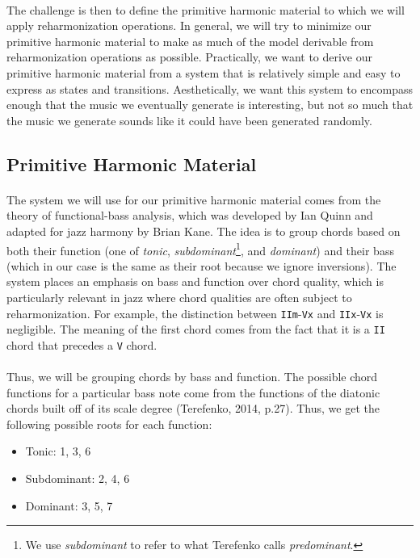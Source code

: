 \documentclass[]{article}
\begin{document}
\paragraph{} The challenge is then to define the primitive harmonic material to which we will apply reharmonization operations.  In general, we will try to minimize our primitive harmonic material to make as much of the model derivable from reharmonization operations as possible.  Practically, we want to derive our primitive harmonic material from a system that is relatively simple and easy to express as states and transitions.  Aesthetically, we want this system to encompass enough that the music we eventually generate is interesting, but not so much that the music we generate sounds like it could have been generated randomly.

\subsection{Primitive Harmonic Material}
\paragraph{} The system we will use for our primitive harmonic material comes from the theory of functional-bass analysis, which was developed by Ian Quinn and adapted for jazz harmony by Brian Kane.  The idea is to group chords based on both their function (one of \textit{tonic}, \textit{subdominant}\footnote{We use \textit{subdominant} to refer to what Terefenko calls \textit{predominant}.}, and \textit{dominant}) and their bass (which in our case is the same as their root because we ignore inversions).  The system places an emphasis on bass and function over chord quality, which is particularly relevant in jazz where chord qualities are often subject to reharmonization.  For example, the distinction between \texttt{IIm}-\texttt{Vx} and \texttt{IIx}-\texttt{Vx} is negligible.  The meaning of the first chord comes from the fact that it is a \texttt{II} chord that precedes a \texttt{V} chord.

\paragraph{} Thus, we will be grouping chords by bass and function.  The possible chord functions for a particular bass note come from the functions of the diatonic chords built off of its scale degree (Terefenko, 2014, p.27).  Thus, we get the following possible roots for each function:
\begin{itemize}
	\item{Tonic:} 1, 3, 6
	\item{Subdominant:} 2, 4, 6
	\item{Dominant:} 3, 5, 7
\end{itemize}
\end{document}
